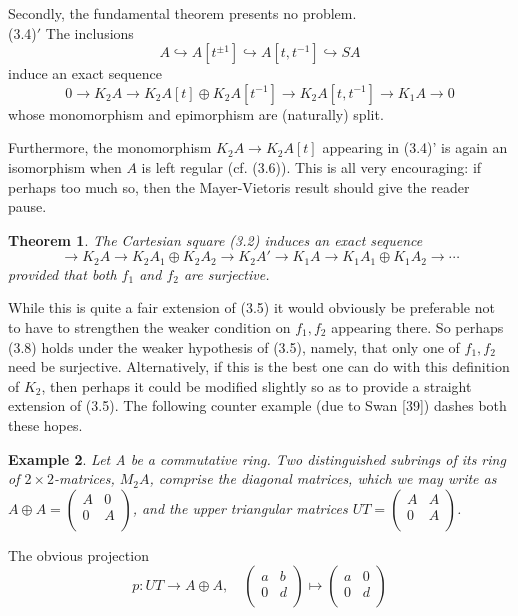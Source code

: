 \documentclass[openany,leqno]{book}  %
\newtheorem{theorem}{Theorem}[chapter]
\newtheorem{ex}[theorem]{Example}
\begin{document}
Secondly, the fundamental theorem presents no problem.\\
(3.4)$'$ The inclusions
\[A \hookrightarrow A[t^{\pm 1}]\hookrightarrow  A[t,t^{-1}]\hookrightarrow SA\]
induce an exact sequence
\[0 \longrightarrow K_{2} A \longrightarrow K_{2}A[t] \oplus K_{2}A[t^{-1}] \longrightarrow K_{2}A[t,t^{-1}]\longrightarrow K_{1}A \longrightarrow 0\]
whose monomorphism and epimorphism are (naturally) split.


Furthermore, the monomorphism $K_2A \longrightarrow K_2A[t]$ appearing in (3.4)' is again an isomorphism when $A$ is left regular (cf. (3.6)). This is all very encouraging: if perhaps too much so, then the Mayer-Vietoris result should give the reader pause.
\begin{theorem}
The Cartesian square (3.2) induces an exact sequence 
\[ \longrightarrow K_2 A \longrightarrow K_2 A_1\oplus K_2A_2 \longrightarrow K_2 A' \longrightarrow K_{1}A\longrightarrow K_1 A_1\oplus K_1A_2 \longrightarrow \cdots\]
provided that both $f_1$ and $f_2$ are surjective.
\end{theorem}
While this is quite a fair extension of (3.5) it would obviously be preferable not to have to strengthen the weaker condition on $f_1, f_2$ appearing there. So perhaps (3.8) holds under the weaker hypothesis of (3.5), namely, that only one of $f_1, f_2$ need be surjective. Alternatively, if this is the best one can do with this definition of $K_2$, then perhaps it could be modified slightly so as to provide a straight extension of (3.5). The following counter example (due to Swan [39]) dashes both these hopes.
\begin{ex}
	Let A be a commutative ring. Two distinguished subrings of its ring of
$2\times 2$-matrices, $M_2 A$, comprise the diagonal matrices, which we may write as $A\oplus A= \begin{pmatrix}
A  & 0\\
0& A\\
\end{pmatrix}$, and the upper triangular matrices $UT =\begin{pmatrix}
A  & A\\
0& A\\
\end{pmatrix}$.
\end{ex}
The obvious projection
\[p\colon  UT\longrightarrow A\oplus A,\quad \begin{pmatrix}
a  & b\\
0& d\\
\end{pmatrix} \mapsto \begin{pmatrix}
a  & 0\\
0& d\\
\end{pmatrix}\]
\end{document}
